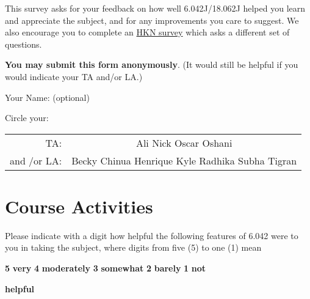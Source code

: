 \documentclass[handout]{mcs}
\begin{document}

\iffalse
\section{Purpose}

The EECS Department is trying to develop a system to monitor and
improve teaching effectivness.  Part of this effort involves formulating
and checking an Educational Objectives and Outcomes statement like the one
for 6.042 on the course web page.
\fi

This survey asks for your feedback on how well 6.042J/18.062J helped
you learn and appreciate the subject, and
\iffalse
.  Comparing student self-assessments given in this survey to
student grades helps us determine how to improve the course.
We would also be grateful\fi for any improvements you care to suggest.
We also encourage you to complete an
\href{https://sixweb.mit.edu/student/evaluate/6.042-s2011}{HKN survey}
which asks a different set of questions.

\textbf{You may submit this form anonymously}.  (It would still be
helpful if you would indicate your TA and/or LA.)

\large{Your Name: (optional)} \brule{3in}

\large{Circle your:}
\begin{center}
  \begin{tabular}{rc}
TA: &  Ali  \qquad\qquad  Nick   \qquad\qquad Oscar   \qquad\qquad Oshani\\
and /or LA: &
Becky \quad
Chinua  \quad
Henrique \quad
Kyle \quad
Radhika \quad
Subha \quad
Tigran
  \end{tabular}
\end{center}

\section*{Course Activities}

Please indicate with a digit how helpful the following features of
6.042 were to you in taking the subject, where digits from five (5) to
one (1) mean
\begin{center}
\textbf{5}  \textbf{very} \qquad
\textbf{4}  \textbf{moderately}\qquad
\textbf{3} \textbf{somewhat}\qquad
\textbf{2} \textbf{barely}\qquad
\textbf{1} \textbf{not}

  \textbf{helpful}
\end{center}
\end{document}
